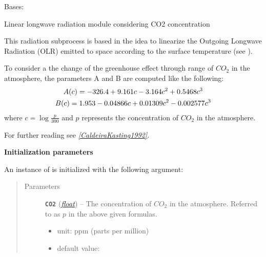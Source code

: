 \documentclass[letterpaper,10pt,english]{sphinxmanual}
\begin{document}
\begin{fulllineitems}
\label{api/climlab.radiation:climlab.radiation.AplusBT.AplusBT_CO2}
Bases: {\hyperref[api/climlab.process:climlab.process.energy_budget.EnergyBudget]{\emph{}}}

Linear longwave radiation module considering CO2 concentration

This radiation subprocess is based in the idea to linearize the Outgoing 
Longwave Radiation (OLR) emitted to space according to the surface temperature
(see {\hyperref[api/climlab.radiation:climlab.radiation.AplusBT.AplusBT]{\emph{}}}).

To consider a the change of the greenhouse effect through range of
\(CO_2\) in the atmosphere, the parameters A and B are computed like
the following:
\begin{gather}
\begin{split}A(c) = -326.4 + 9.161 c - 3.164 c^2 + 0.5468 c^3            \end{split}\notag\\\begin{split}B(c) =  1.953 - 0.04866 c + 0.01309 c^2 - 0.002577 c^3\end{split}\notag
\end{gather}
where \(c=\log \frac{p}{300}\) and \(p\) represents 
the concentration of \(CO_2\) in the atmosphere.

For further reading see \label{api/climlab.radiation:id1}{\hyperref[references:caldeirakasting1992]{\emph{{[}CaldeiraKasting1992{]}}}}.

\textbf{Initialization parameters}

An instance of  is initialized with the following 
argument:
\begin{quote}\begin{description}
\item[{Parameters}] \leavevmode
\textbf{\texttt{CO2}} (\href{http://docs.python.org/2.7/library/functions.html\#float}{\emph{float}}) -- 
The concentration of \(CO_2\) in the atmosphere.
Referred to as \(p\) in the above given formulas.
\begin{itemize}
\item {} 
unit: \(\textrm{ppm}\) (parts per million)

\item {} 
default value: 


\end{itemize}
\end{description}
\end{quote}
\end{fulllineitems}
\end{document}
